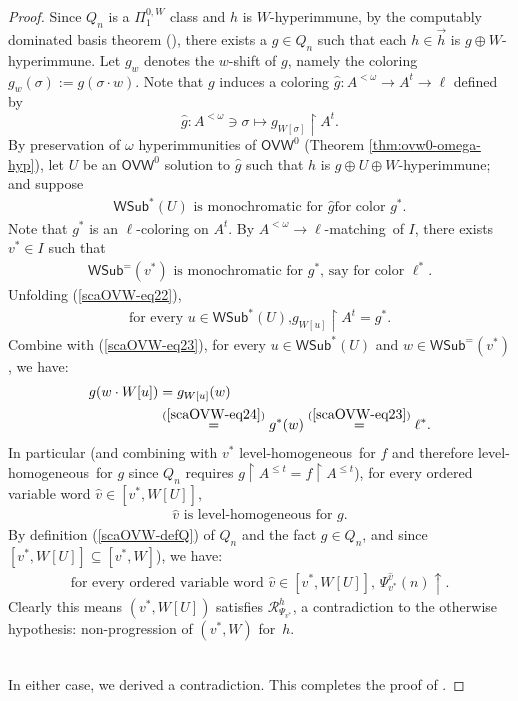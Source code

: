 \documentclass{article}
\def\msf{\mathsf}
\def\mcal{\mathcal}
\def\h{\hat}
\def\uhr{\upharpoonright}
\def\wsamelong{\mathsf{WSub}^{=}}
\def\wshorter{\mathsf{WSub}^{*}}
\def\sectionallymonochromatic{level-homogeneous}
\def\hjsufficient{$A^{<\omega}\rightarrow\ell$-matching}%
\numberwithin{theorem}{section}
\theoremstyle{definition}
\begin{document}
\begin{proof}
Since $Q_n$ is a $\Pi_1^{0,W}$ class and $h$ is $W$-hyperimmune,
by the computably dominated basis theorem (\cite[Theorem 2.4]{jockusch1972pi}), there exists a $g\in Q_n$ such that each $h \in \vec{h}$ is  $g\oplus W$-hyperimmune.
Let $g_w$ denotes the $w$-shift of $g$, namely the coloring $g_w(\sigma):= g(\sigma\cdot w)$.
Note that $g$ induces a coloring $\h g : A^{<\omega} \to A^t \to \ell$ defined by
$$
\h g: A^{<\omega}\ni\sigma\mapsto g_{W[\sigma]}\uhr A^t.
$$
By preservation of $\omega$ hyperimmunities of $\msf{OVW}^0$
(Theorem \ref{thm:ovw0-omega-hyp}),
let $U$ be an $\msf{OVW}^0$ solution to $\h g$
such that $h$ is $g\oplus U\oplus W$-hyperimmune;
and suppose
\begin{align}\label{scaOVW-eq22}
\text{$\wshorter(U)$ is monochromatic for $\h g$
for color $g^*$.}
\end{align}
Note that $g^*$ is an $\ell$-coloring on $A^t$.
 By \hjsufficient\ of $I$,
there exists $v^*\in I$ such that
\begin{align}\label{scaOVW-eq23}
\wsamelong(v^*)\text{ is monochromatic\ for $g^*$,
say for color $\ell^*$}.
\end{align}
Unfolding (\ref{scaOVW-eq22}),
\begin{align}\label{scaOVW-eq24}
\text{for every $u\in \wshorter(U)$,
$g_{W[u]}\uhr A^t = g^*$
}.
\end{align}
Combine with (\ref{scaOVW-eq23}),
for every $u\in \wshorter(U)$ and $w\in \wsamelong(v^*)$,
we have:
\begin{align}
g(w\cdot W[u]) &= g_{W[u]}(w)\\ \nonumber
&\overset{(\ref{scaOVW-eq24})}=
g^*(w) \overset{(\ref{scaOVW-eq23})}{ =}\ell^*.
\end{align}
In particular (and combining with $v^*$ \sectionallymonochromatic\ for $f$ and therefore
\sectionallymonochromatic\ for $g$ since $Q_n$ requires $g\uhr A^{\leq t} = f\uhr A^{\leq t}$),
for every ordered variable word $\h v\in [v^*,W[U]]$,
\begin{align}
\nonumber
\h v\text{ is \sectionallymonochromatic\ for $g$.}
\end{align}
By definition (\ref{scaOVW-defQ}) of $Q_n$
and the fact $g \in Q_n$, and since $[v^*,W[U]]\subseteq [v^*,W]$),
we have:
\begin{align}
\label{scaOVW-eq25}
\text{for every ordered variable word $\h v\in [v^*,W[U]]$, }\Psi_{v^*}^{\h v}(n)\uparrow.
\end{align}
Clearly this means
$(v^*,W[U])$ satisfies $\mcal R^h_{\Psi_{v^*}}$,
 a contradiction to the otherwise hypothesis:  non-progression of $(v^*,W)$ for~$h$.


\ \\
In either case, we derived a contradiction. This completes the proof of .
\end{proof}
\end{document}
